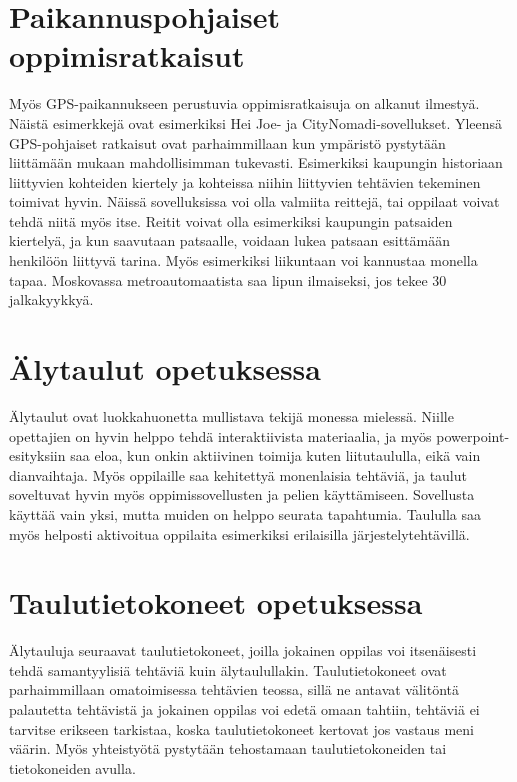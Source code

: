 \documentclass[utf8,bachelor]{gradu3}
\begin{document}
\section{Paikannuspohjaiset oppimisratkaisut}
Myös GPS-paikannukseen perustuvia oppimisratkaisuja on alkanut ilmestyä. Näistä esimerkkejä ovat esimerkiksi Hei Joe- ja CityNomadi-sovellukset. Yleensä GPS-pohjaiset ratkaisut ovat parhaimmillaan kun ympäristö pystytään liittämään mukaan mahdollisimman tukevasti. Esimerkiksi kaupungin historiaan liittyvien kohteiden kiertely ja kohteissa niihin liittyvien tehtävien tekeminen toimivat hyvin. \parencite[][]{heijoe}
Näissä sovelluksissa voi olla valmiita reittejä, tai oppilaat voivat tehdä niitä myös itse. Reitit voivat olla esimerkiksi kaupungin patsaiden kiertelyä, ja kun saavutaan patsaalle, voidaan lukea patsaan esittämään henkilöön liittyvä tarina. Myös esimerkiksi liikuntaan voi kannustaa monella tapaa. Moskovassa metroautomaatista saa lipun ilmaiseksi, jos tekee 30 jalkakyykkyä. \parencite[][]{kyykky}


\section{Älytaulut opetuksessa}
Älytaulut ovat luokkahuonetta mullistava tekijä monessa mielessä. Niille opettajien on hyvin helppo tehdä interaktiivista materiaalia, ja myös powerpoint-esityksiin saa eloa, kun onkin aktiivinen toimija kuten liitutaululla, eikä vain dianvaihtaja. Myös oppilaille saa kehitettyä monenlaisia tehtäviä, ja taulut soveltuvat hyvin myös oppimissovellusten ja pelien käyttämiseen. Sovellusta käyttää vain yksi, mutta muiden on helppo seurata tapahtumia. Taululla saa myös helposti aktivoitua oppilaita esimerkiksi erilaisilla järjestelytehtävillä.

\section{Taulutietokoneet opetuksessa}
Älytauluja seuraavat taulutietokoneet, joilla jokainen oppilas voi itsenäisesti tehdä samantyylisiä tehtäviä kuin älytaulullakin. Taulutietokoneet ovat parhaimmillaan omatoimisessa tehtävien teossa, sillä ne antavat välitöntä palautetta tehtävistä ja jokainen oppilas voi edetä omaan tahtiin, tehtäviä ei tarvitse erikseen tarkistaa, koska taulutietokoneet kertovat jos vastaus meni väärin. Myös yhteistyötä pystytään tehostamaan taulutietokoneiden tai tietokoneiden avulla.
\end{document}
